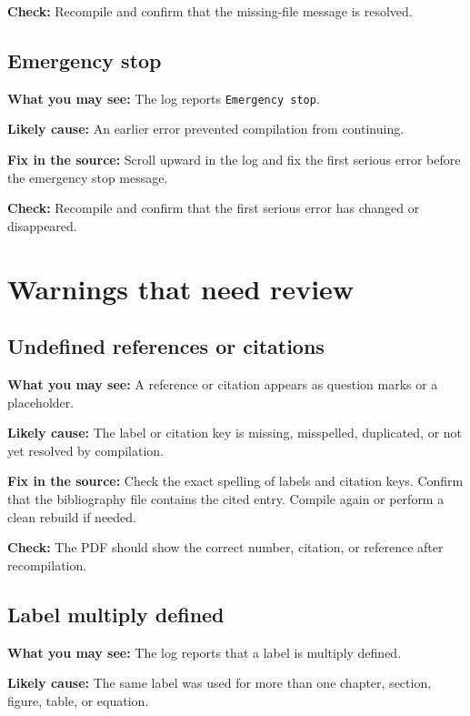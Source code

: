 \textbf{Check:} Recompile and confirm that the missing-file message is resolved.

\subsection{Emergency stop}
\label{subsec:emergency-stop}

\textbf{What you may see:} The log reports \texttt{Emergency stop}.

\textbf{Likely cause:} An earlier error prevented compilation from continuing.

\textbf{Fix in the source:} Scroll upward in the log and fix the first serious error before the emergency stop message.

\textbf{Check:} Recompile and confirm that the first serious error has changed or disappeared.

\section{Warnings that need review}
\label{sec:warnings-need-review}

\subsection{Undefined references or citations}
\label{subsec:undefined-references-citations}

\textbf{What you may see:} A reference or citation appears as question marks or a placeholder.

\textbf{Likely cause:} The label or citation key is missing, misspelled, duplicated, or not yet resolved by compilation.

\textbf{Fix in the source:} Check the exact spelling of labels and citation keys. Confirm that the bibliography file contains the cited entry. Compile again or perform a clean rebuild if needed.

\textbf{Check:} The PDF should show the correct number, citation, or reference after recompilation.

\subsection{Label multiply defined}
\label{subsec:label-multiply-defined}

\textbf{What you may see:} The log reports that a label is multiply defined.

\textbf{Likely cause:} The same label was used for more than one chapter, section, figure, table, or equation.

